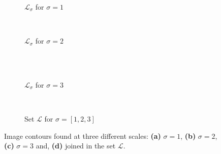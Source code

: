 \begin{figure}[!ht]
    \centering
    \begin{subfigure}[b]{0.45\textwidth}
        \caption{$\mathcal{L}_{\sigma}$ for $\sigma=1$}
        \label{fig:cnts_scale1}
    \end{subfigure}
    ~ %
    \begin{subfigure}[b]{0.45\textwidth}
        \caption{$\mathcal{L}_{\sigma}$ for $\sigma=2$}
        \label{fig:cnts_scale2}
    \end{subfigure}\\
        ~ %
    \begin{subfigure}[b]{0.45\textwidth}
        \caption{$\mathcal{L}_{\sigma}$ for $\sigma=3$}
        \label{fig:cnts_scale3}
    \end{subfigure}
        ~ %
    \begin{subfigure}[b]{0.45\textwidth}
        \caption{Set $\mathcal{L}$ for $\sigma=[1, 2 ,3]$}
        \label{fig:all_cnts}
    \end{subfigure}
    \caption{Image contours found at three different scales: \textbf{(a)} $\sigma=1$, \textbf{(b)} $\sigma=2$, \textbf{(c)} $\sigma=3$ and, \textbf{(d)} joined in the set $\mathcal{L}$.}\label{fig:multiscale_cnts}
\end{figure}

